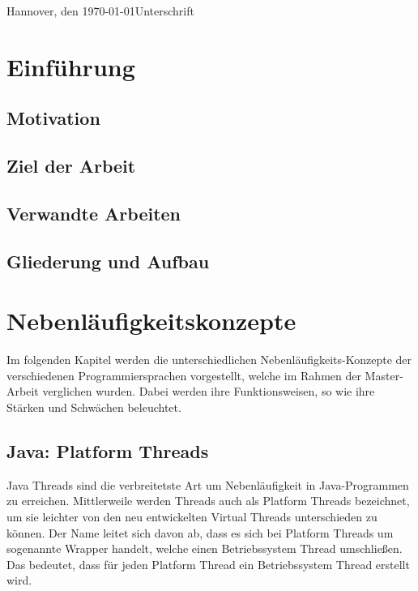 \documentclass[fontsize=12pt,paper=a4,twoside=semi,parskip=half-,headsepline,headinclude]{scrreprt}
\begin{document}
Hannover, den \today \hfill Unterschrift


\newpage 
\thispagestyle{empty}
\quad 
\newpage


  \tableofcontents  %

\listoffigures      %

\listoftables       %

\chapter{Einführung}

\section{Motivation}

\section{Ziel der Arbeit}

\section{Verwandte Arbeiten}

\section{Gliederung und Aufbau}



\chapter{Nebenläufigkeitskonzepte}

Im folgenden Kapitel werden die unterschiedlichen Nebenläufigkeits-Konzepte der verschiedenen Programmiersprachen vorgestellt, welche im Rahmen der Master-Arbeit verglichen wurden. Dabei werden ihre Funktionsweisen, so wie ihre Stärken und Schwächen beleuchtet.

\section{Java: Platform Threads}

Java Threads sind die verbreitetste Art um Nebenläufigkeit in Java-Programmen zu erreichen. Mittlerweile werden Threads auch als Platform Threads bezeichnet, um sie leichter von den neu entwickelten Virtual Threads unterschieden zu können. Der Name leitet sich davon ab, dass es sich bei Platform Threads um sogenannte Wrapper handelt, welche einen Betriebssystem Thread umschließen. Das bedeutet, dass für jeden Platform Thread ein Betriebssystem Thread erstellt wird.
\end{document}
